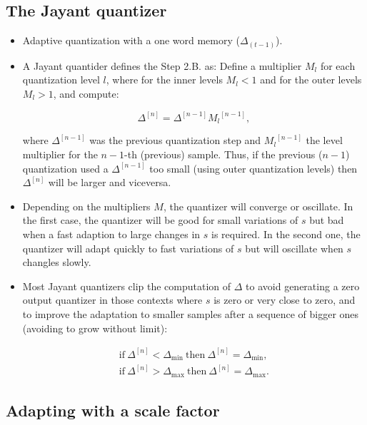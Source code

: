 
\subsection{The Jayant quantizer~\cite{jayant1974digital}}

\begin{itemize}
\item
  Adaptive quantization with a one word memory (\(\Delta_{(t-1)}\)).
\item
  A Jayant quantider defines the Step 2.B. as: Define a multiplier
  \(M_l\) for each quantization level \(l\), where for the inner levels
  \(M_l<1\) and for the outer levels \(M_l>1\), and compute:

  \[
    \Delta^{[n]} = \Delta^{[n-1]}{M_l}^{[n-1]},
  \]

  where \(\Delta^{[n-1]}\) was the previous quantization step and
  \({M_l}^{[n-1]}\) the level multiplier for the \(n-1\)-th (previous)
  sample. Thus, if the previous (\(n-1\)) quantization used a
  \(\Delta^{[n-1]}\) too small (using outer quantization levels) then
  \(\Delta^{[n]}\) will be larger and viceversa.
\item
  Depending on the multipliers \(M\), the quantizer will converge or
  oscillate. In the first case, the quantizer will be good for small
  variations of \(s\) but bad when a fast adaption to large changes in
  \(s\) is required. In the second one, the quantizer will adapt quickly
  to fast variations of \(s\) but will oscillate when \(s\) changles
  slowly.
\item
  Most Jayant quantizers clip the computation of \(\Delta\) to avoid
  generating a zero output quantizer in those contexts where \(s\) is
  zero or very close to zero, and to improve the adaptation to smaller
  samples after a sequence of bigger ones (avoiding to grow without
  limit):

  \[
  \begin{array}{ll}
    \text{if}~\Delta^{[n]}<\Delta_{\text{min}}~\text{then}~\Delta^{[n]} = \Delta_{\text{min}},\\
    \text{if}~\Delta^{[n]}>\Delta_{\text{max}}~\text{then}~\Delta^{[n]} = \Delta_{\text{max}}.
  \end{array}
  \]
\end{itemize}


\subsection{Adapting with a scale factor}

